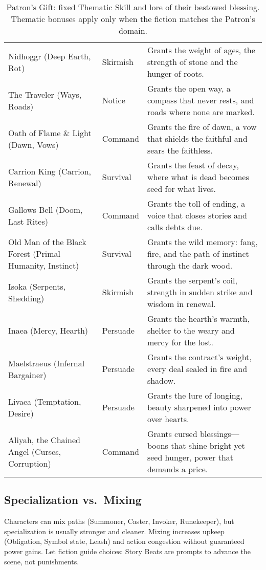 \begin{table}[H]
\begin{tabular}{@{}p{3.8cm}p{3.8cm}p{7.5cm}@{}}
Nidhoggr (Deep Earth, Rot) & Skirmish & Grants the weight of ages, the strength of stone and the hunger of roots. \\
The Traveler (Ways, Roads) & Notice & Grants the open way, a compass that never rests, and roads where none are marked. \\
Oath of Flame \& Light (Dawn, Vows) & Command & Grants the fire of dawn, a vow that shields the faithful and sears the faithless. \\
Carrion King (Carrion, Renewal) & Survival & Grants the feast of decay, where what is dead becomes seed for what lives. \\
Gallows Bell (Doom, Last Rites) & Command & Grants the toll of ending, a voice that closes stories and calls debts due. \\
Old Man of the Black Forest (Primal Humanity, Instinct) & Survival & Grants the wild memory: fang, fire, and the path of instinct through the dark wood. \\
Isoka (Serpents, Shedding) & Skirmish & Grants the serpent’s coil, strength in sudden strike and wisdom in renewal. \\
Inaea (Mercy, Hearth) & Persuade & Grants the hearth’s warmth, shelter to the weary and mercy for the lost. \\
Maelstraeus (Infernal Bargainer) & Persuade & Grants the contract’s weight, every deal sealed in fire and shadow. \\
Livaea (Temptation, Desire) & Persuade & Grants the lure of longing, beauty sharpened into power over hearts. \\
Aliyah, the Chained Angel (Curses, Corruption) & Command & Grants cursed blessings—boons that shine bright yet seed hunger, power that demands a price. \\
\bottomrule
\end{tabular}
\caption{Patron’s Gift: fixed Thematic Skill and lore of their bestowed blessing. Thematic bonuses apply only when the fiction matches the Patron’s domain.}
\label{tab:gift-thematic-map}
\end{table}

\subsection{Specialization vs.\ Mixing}
\label{subsec:mixing}
Characters can mix paths (Summoner, Caster, Invoker, Runekeeper), but specialization is usually stronger and cleaner. Mixing increases upkeep (Obligation, Symbol state, Leash) and action congestion without guaranteed power gains. Let fiction guide choices: Story Beats are prompts to advance the scene, not punishments.

